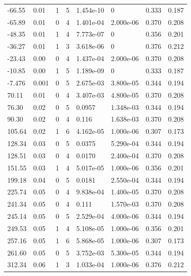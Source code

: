 \documentclass[preview]{standalone}
\begin{document}
{{\begin{tabular}{L{1.2cm}C{1.2cm} C{0.3cm}C{0.5cm} C{1.4cm}C{1.4cm} C{1.4cm}C{1.4cm}}
  -66.55  &  0.01  & 1     &  5 &  1.454e-10  & 0  & 0.333 &  0.187   \\ 
  -65.89  &  0.01  & 0     &  4 &  1.401e-04  & 2.000e-06  & 0.370 &  0.208   \\ 
  -48.35  &  0.01  & 1     &  4 &  7.773e-07  & 0  & 0.356 &  0.201   \\ 
  -36.27  &  0.01  & 1     &  3 &  3.618e-06  & 0  & 0.376 &  0.212   \\ 
  -23.43  &  0.00  & 0     &  4 &  1.437e-04  & 2.000e-06  & 0.370 &  0.208   \\ 
  -10.85  &  0.00  & 1     &  5 &  1.189e-09  & 0  & 0.333 &  0.187   \\ 
  -7.476  &  0.001  & 0     &  5 &  2.675e-03  & 3.800e-05  & 0.344 &  0.194   \\ 
  70.11  &  0.01  & 0     &  4 &  3.407e-03  & 4.800e-05  & 0.370 &  0.208   \\ 
  76.30  &  0.02  & 0     &  5 &  0.0957  & 1.348e-03  & 0.344 &  0.194   \\ 
  90.30  &  0.02  & 0     &  4 &  0.116  & 1.638e-03  & 0.370 &  0.208   \\ 
  105.64  &  0.02  & 1     &  6 &  4.162e-05  & 1.000e-06  & 0.307 &  0.173   \\ 
  128.34  &  0.03  & 0     &  5 &  0.0375  & 5.290e-04  & 0.344 &  0.194   \\ 
  128.51  &  0.03  & 0     &  4 &  0.0170  & 2.400e-04  & 0.370 &  0.208   \\ 
  151.55  &  0.03  & 1     &  4 &  5.017e-05  & 1.000e-06  & 0.356 &  0.201   \\ 
  199.18  &  0.04  & 0     &  5 &  0.0181  & 2.550e-04  & 0.344 &  0.194   \\ 
  225.74  &  0.05  & 0     &  4 &  9.838e-04  & 1.400e-05  & 0.370 &  0.208   \\ 
  241.34  &  0.05  & 0     &  4 &  0.111  & 1.570e-03  & 0.370 &  0.208   \\ 
  245.14  &  0.05  & 0     &  5 &  2.529e-04  & 4.000e-06  & 0.344 &  0.194   \\ 
  249.53  &  0.05  & 1     &  4 &  5.108e-05  & 1.000e-06  & 0.356 &  0.201   \\ 
  257.16  &  0.05  & 1     &  6 &  5.868e-05  & 1.000e-06  & 0.307 &  0.173   \\ 
  261.60  &  0.05  & 0     &  5 &  3.752e-03  & 5.300e-05  & 0.344 &  0.194   \\ 
  312.34  &  0.06  & 1     &  3 &  1.033e-04  & 1.000e-06  & 0.376 &  0.212   \\ 

\end{tabular}}}
\end{document}
